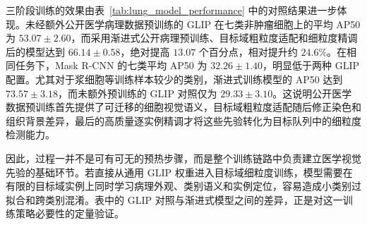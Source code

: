 \begin{table}[htbp]
  \centering
  \caption{多类细胞检测渐进式训练结果}
  \label{tab:lung_stage_training}
  \scriptsize
\end{table}


三阶段训练的效果由表~\ref{tab:lung_model_performance} 中的对照结果进一步体现。未经额外公开医学病理数据预训练的 GLIP 在七类非肿瘤细胞上的平均 AP50 为 $53.07\pm2.60$，而采用渐进式公开病理预训练、目标域粗粒度适配和细粒度精调后的模型达到 $66.14\pm0.58$，绝对提高 $13.07$ 个百分点，相对提升约 $24.6\%$。在相同任务下，Mask R-CNN 的七类平均 AP50 为 $32.26\pm1.40$，明显低于两种 GLIP 配置。尤其对于浆细胞等训练样本较少的类别，渐进式训练模型的 AP50 达到 $73.57\pm3.18$，而未额外预训练的 GLIP 对照仅为 $29.33\pm3.10$。这说明公开医学数据预训练首先提供了可迁移的细胞视觉语义，目标域粗粒度适配随后修正染色和组织背景差异，最后的高质量逐实例精调才将这些先验转化为目标队列中的细粒度检测能力。

因此，过程一并不是可有可无的预热步骤，而是整个训练链路中负责建立医学视觉先验的基础环节。若直接从通用 GLIP 权重进入目标域细粒度训练，模型需要在有限的目标域实例上同时学习病理外观、类别语义和实例定位，容易造成小类别过拟合和跨类别混淆。表中的 GLIP 对照与渐进式模型之间的差异，正是对这一训练策略必要性的定量验证。

